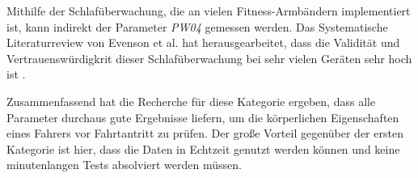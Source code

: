 Mithilfe der Schlafüberwachung, die an vielen Fitness-Armbändern implementiert ist, kann indirekt der Parameter \textit{PW04} gemessen werden. Das Systematische Literaturreview von Evenson et al. hat herausgearbeitet, dass die Validität und Vertrauenswürdigkrit dieser Schlafüberwachung bei sehr vielen Geräten sehr hoch ist \cite{reviewconsumerwearables}.

Zusammenfassend hat die Recherche für diese Kategorie ergeben, dass alle Parameter durchaus gute Ergebnisse liefern, um die körperlichen Eigenschaften eines Fahrers vor Fahrtantritt zu prüfen. Der große Vorteil gegenüber der ersten Kategorie ist hier, dass die Daten in Echtzeit genutzt werden können und keine minutenlangen Tests absolviert werden müssen.
